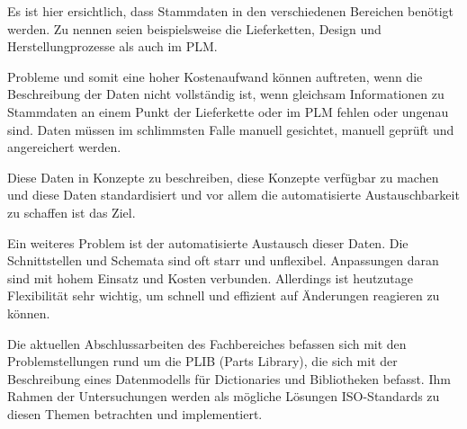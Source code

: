 Es ist hier ersichtlich, dass Stammdaten in den verschiedenen Bereichen benötigt werden. Zu nennen seien beispielsweise die Lieferketten, Design und Herstellungprozesse als auch im \gls{PLM}.     

Probleme und somit eine hoher Kostenaufwand können auftreten, wenn die Beschreibung der Daten nicht vollständig ist, wenn gleichsam Informationen zu Stammdaten an einem Punkt der Lieferkette oder im \gls{PLM} fehlen oder ungenau sind. Daten müssen im schlimmsten Falle manuell gesichtet, manuell geprüft und angereichert werden.  

Diese Daten in Konzepte zu beschreiben, diese Konzepte verfügbar zu machen und diese Daten standardisiert und vor allem die automatisierte Austauschbarkeit zu schaffen ist das Ziel. 

Ein weiteres Problem ist der automatisierte Austausch dieser Daten. Die Schnittstellen und Schemata sind oft starr und unflexibel. Anpassungen daran sind mit hohem Einsatz und Kosten verbunden. Allerdings ist heutzutage Flexibilität sehr wichtig, um schnell und effizient auf Änderungen reagieren zu können. 

Die aktuellen Abschlussarbeiten des Fachbereiches befassen sich mit den Problemstellungen rund um die \gls{PLIB} (Parts Library), die sich mit der Beschreibung eines Datenmodells für Dictionaries und Bibliotheken befasst. Ihm Rahmen der Untersuchungen werden als mögliche Lösungen ISO-Standards zu diesen Themen betrachten und implementiert. 

